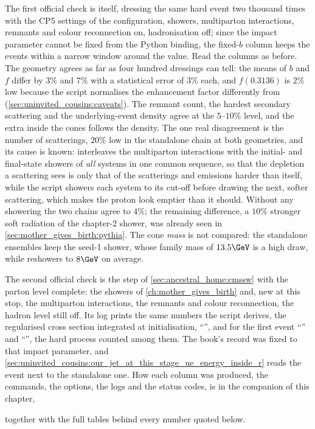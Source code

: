 The first official check is \PYTHIA itself, dressing the same hard event
two thousand times with the CP5 settings of the \CMSSW configuration,
showers, multiparton interactions, remnants and colour reconnection on,
hadronisation off; since the impact parameter cannot be fixed from the
Python binding, the fixed-$b$ column keeps the \PYTHIA events within a
narrow window around the \CMSSW value. Read the columns as before. The
geometry agrees as far as four hundred dressings can tell: the means of $b$
and $f$ differ by $3\%$ and $7\%$ with a statistical error of $3\%$ each,
and $f(0.3136)$ is $2\%$ low because the script normalises the enhancement
factor differently from \PYTHIA (\cref{sec:uninvited_cousins:caveats}). The remnant count, the hardest secondary scattering and the
underlying-event density agree at the $5$--$10\%$ level, and the extra \pt
inside the cones follows the density. The one real disagreement is the
number of scatterings, $20\%$ low in the standalone chain at both
geometries, and its cause is known: \PYTHIA interleaves the multiparton
interactions with the initial- and final-state showers of \emph{all}
systems in one common \pt sequence, so that the depletion a scattering sees
is only that of the scatterings and emissions harder than itself, while
the script showers each system to its cut-off before drawing the next,
softer scattering, which makes the proton look emptier than it should.
Without any showering the two chains agree to $4\%$; the remaining
difference, a $10\%$ stronger soft radiation of the chapter-2 shower, was
already seen in \cref{sec:mother_gives_birth:pythia}. The cone \emph{mass}
is not compared: the standalone ensembles keep the seed-1 shower, whose
family mass of $13.5\GeV$ is a high draw, while \PYTHIA reshowers to
$8\GeV$ on average.
\label{sec:uninvited_cousins:cmssw}

The second official check is the  step of
\cref{sec:ancestral_home:cmssw} with the parton level complete: the showers
of \cref{ch:mother_gives_birth} and, new at this stop, the multiparton
interactions, the remnants and colour reconnection, the hadron level still
off. Its log prints the same numbers the script derives, the regularised cross section integrated at
initialisation, ``'',
and for the first event ``'' and ``'', the hard
process counted among them. The book's record was fixed to that impact
parameter, and \cref{sec:uninvited_cousins:our_jet_at_this_stage_ue_energy_inside_r}
reads the \CMSSW event next to the standalone one. How each column was
produced, the commands, the options, the logs and the status codes, is in
the companion of this chapter,
\begin{center}
\end{center}
together with the full tables behind every number quoted below.


